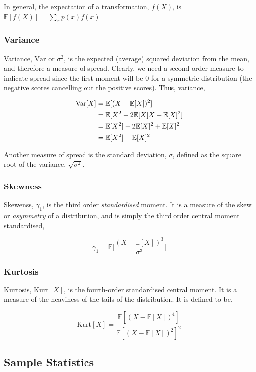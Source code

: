 \documentclass[11pt]{amsart}
\begin{document}
In general, the expectation of a transformation, $f(X)$, is $\mathbb{E}[f(X)] = \sum_x p(x)f(x)$

\subsubsection{Variance}

Variance, $\text{Var}$ or $\sigma^2$, is the expected (average) squared deviation from the mean, and therefore a measure of spread. Clearly, we need a second order measure to indicate spread since the first moment will be 0 for a symmetric distribution (the negative scores cancelling out the positive scores). Thus, variance,

\begin{align}
\text{Var}[X] &= \mathbb{E}[(X - \mathbb{E}[X])^2] \notag \\
&= \mathbb{E}[X^2 - 2\mathbb{E}[X]X + \mathbb{E}[X]^2] \notag \\
&= \mathbb{E}[X^2] - 2\mathbb{E}[X]^2 + \mathbb{E}[X]^2 \notag \\
&= \mathbb{E}[X^2] - \mathbb{E}[X]^2 \notag
\end{align}

Another measure of spread is the standard deviation, $\sigma$, defined as the square root of the variance, $\sqrt{\sigma^2}$.

\subsubsection{Skewness}

Skewenss, $\gamma_1$, is the third order \emph{standardised} moment. It is a measure of the skew or \emph{asymmetry} of a distribution, and is simply the third order central moment standardised,

$$
\gamma_1 = \mathbb{E}\Bigg[\frac{(X - \mathbb{E}[X])^3}{\sigma^3}\Bigg]
$$

\subsubsection{Kurtosis}

Kurtosis, $\text{Kurt}[X]$, is the fourth-order standardised central moment. It is a measure of the heaviness of the tails of the distribution. It is defined to be,

$$
\text{Kurt}[X] = \frac{\mathbb{E}[(X - \mathbb{E}[X])^4]}{\mathbb{E}[(X - \mathbb{E}[X])^2]^2}
$$

\subsection{Sample Statistics}
\end{document}
